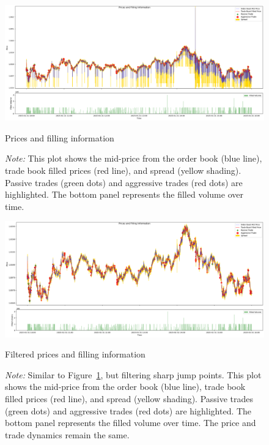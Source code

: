 \begin{figure}
    \centering
    \includegraphics[width=\linewidth]{figures/Prices and Filling Information.png}
    \caption{Prices and filling information}
    \caption*{\textit{Note:} This plot shows the mid-price from the order book (blue line), trade book filled prices (red line), and spread (yellow shading). Passive trades (green dots) and aggressive trades (red dots) are highlighted. The bottom panel represents the filled volume over time.}
    \label{fig:p_f_i}
\end{figure}

\begin{figure}
    \centering
    \includegraphics[width=\linewidth]{figures/Filtered Prices and Filling Information.png}
    \caption{Filtered prices and filling information}
    \caption*{\textit{Note:} Similar to Figure~\ref{fig:p_f_i}, but filtering sharp jump points. This plot shows the mid-price from the order book (blue line), trade book filled prices (red line), and spread (yellow shading). Passive trades (green dots) and aggressive trades (red dots) are highlighted. The bottom panel represents the filled volume over time. The price and trade dynamics remain the same.}
    \label{fig:f_p_f_i}
\end{figure}



